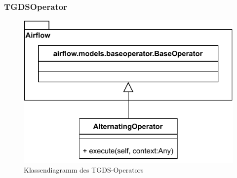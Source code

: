 \subsubsection{TGDSOperator}
\begin{figure}[H]
    \includegraphics[width=1\textwidth]{res/Klassen/tgdsOp.pdf}
    \caption{Klassendiagramm des TGDS-Operators}
\end{figure}


